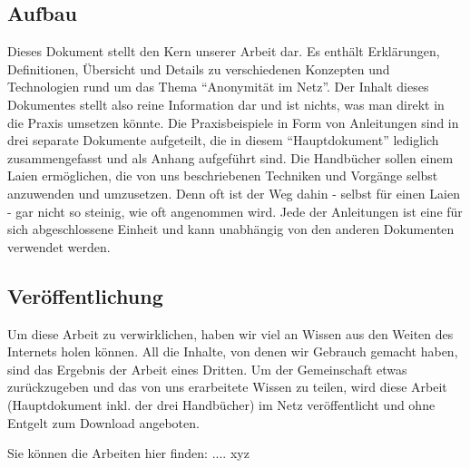 \subsection{Aufbau}
Dieses Dokument stellt den Kern unserer Arbeit dar. Es enthält Erklärungen, Definitionen, Übersicht und Details zu verschiedenen Konzepten und Technologien rund um das Thema ``Anonymität im Netz''. Der Inhalt dieses Dokumentes stellt also reine Information dar und ist nichts, was man direkt in die Praxis umsetzen könnte. Die Praxisbeispiele in Form von Anleitungen sind in drei separate Dokumente aufgeteilt, die in diesem ``Hauptdokument'' lediglich zusammengefasst und als Anhang aufgeführt sind. Die Handbücher sollen einem Laien ermöglichen, die von uns beschriebenen Techniken und Vorgänge selbst anzuwenden und umzusetzen. Denn oft ist der Weg dahin - selbst für einen Laien - gar nicht so steinig, wie oft angenommen wird. Jede der Anleitungen ist eine für sich abgeschlossene Einheit und kann unabhängig von den anderen Dokumenten verwendet werden.

\subsection{Veröffentlichung}
Um diese Arbeit zu verwirklichen, haben wir viel an Wissen aus den Weiten des Internets holen können. All die Inhalte, von denen wir Gebrauch gemacht haben, sind das Ergebnis der Arbeit eines Dritten. Um der Gemeinschaft etwas zurückzugeben und das von uns erarbeitete Wissen zu teilen, wird diese Arbeit (Hauptdokument inkl. der drei Handbücher) im Netz veröffentlicht und ohne Entgelt zum Download angeboten.

Sie können die Arbeiten hier finden: .... xyz
